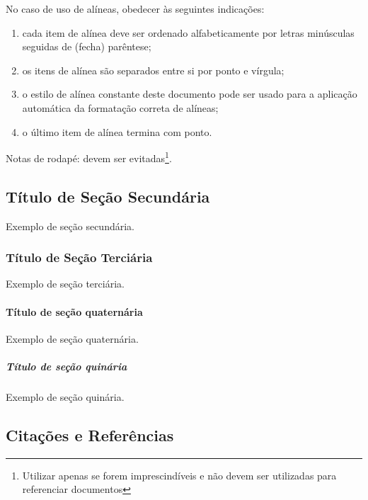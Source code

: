 \documentclass[%
  a4paper,%
  12pt,%
  fleqn,%
  english,%
  brazilian,%
]{article}
\begin{document}
No caso de uso de alíneas, obedecer às seguintes indicações:

\begin{enumerate}[label = {\alphsect}]
\item cada item de alínea deve ser ordenado alfabeticamente por letras minúsculas seguidas de (fecha) parêntese;
\item os itens de alínea são separados entre si por ponto e vírgula;
\item o estilo de alínea constante deste documento pode ser usado para a aplicação automática da formatação correta de alíneas;
\item o último item de alínea termina com ponto.
\end{enumerate}

Notas de rodapé: devem ser evitadas\footnote{Utilizar apenas se forem imprescindíveis e não devem ser utilizadas para referenciar documentos}.

\subsection{Título de Seção Secundária}%
\label{ssect:lvl-2}

Exemplo de seção secundária.

\subsubsection{Título de Seção Terciária}%
\label{sssect:lvl-3}

Exemplo de seção terciária.

\paragraph{Título de seção quaternária}%
\label{prgh:lvl-4}

Exemplo de seção quaternária.

\subparagraph{Título de seção quinária}%
\label{sprgh:lvl-5}

Exemplo de seção quinária.

\subsection{Citações e Referências}%
\label{ssect:cit-ref}%
\end{document}
